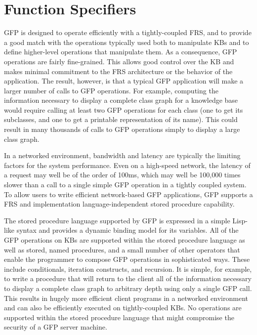 \chapter{Function Specifiers}

GFP is designed to operate efficiently with a tightly-coupled FRS,
and to provide a good match with the operations typically used both to
manipulate KBs and to define higher-level operations that manipulate
them.  As a consequence, GFP operations are fairly fine-grained.  This
allows good control over the KB and makes minimal commitment to the
FRS architecture or the behavior of the application.  The result,
however, is that a typical GFP application will make a larger number
of calls to GFP operations.  For example, computing the information
necessary to display a complete class graph for a knowledge base would
require calling at least two GFP operations for each class (one to get
its subclasses, and one to get a printable representation of its
name).  This could result in many thousands of calls to GFP operations
simply to display a large class graph.

In a networked environment, bandwidth and latency are typically the
limiting factors for the system performance.  Even on a high-speed
network, the latency of a request may well be of the order of 100ms,
which may well be 100,000 times slower than a call to a single simple
GFP operation in a tightly coupled system. To allow users to write
efficient network-based GFP applications, GFP supports a FRS and
implementation language-independent stored procedure capability.

The stored procedure language supported by GFP is expressed in a
simple Lisp-like syntax and provides a dynamic binding model for its
variables.  All of the GFP operations on KBs are supported within the
stored procedure language as well as stored, named procedures, and a
small number of other operators that enable the programmer to compose
GFP operations in sophisticated ways.  These include conditionals,
iteration constructs, and recursion. It is simple, for example, to
write a procedure that will return to the client all of the
information necessary to display a complete class graph to arbitrary
depth using only a single GFP call.  This results in hugely more
efficient client programs in a networked environment and can also be
efficiently executed on tightly-coupled KBs. No operations are
supported within the stored procedure language that might compromise
the security of a GFP server machine.

